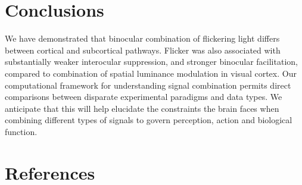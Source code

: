 \documentclass[
]{article}
\begin{document}
\hypertarget{conclusions}{%
\section{Conclusions}\label{conclusions}}

We have demonstrated that binocular combination of flickering light differs between cortical and subcortical pathways. Flicker was also associated with substantially weaker interocular suppression, and stronger binocular facilitation, compared to combination of spatial luminance modulation in visual cortex. Our computational framework for understanding signal combination permits direct comparisons between disparate experimental paradigms and data types. We anticipate that this will help elucidate the constraints the brain faces when combining different types of signals to govern perception, action and biological function.

\hypertarget{references}{%
\section*{References}\label{references}}
\end{document}
